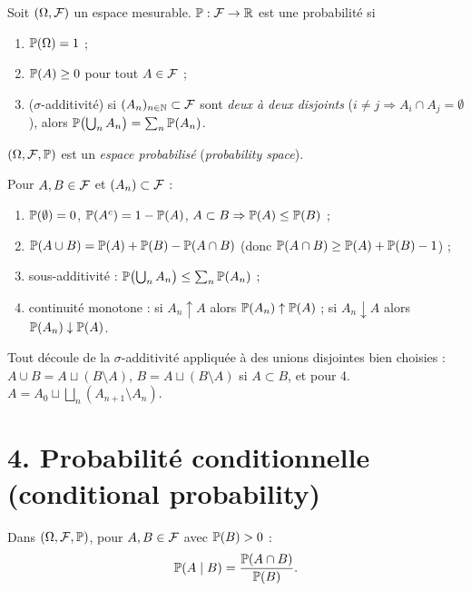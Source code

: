 \documentclass[11pt,a4paper]{article}
\begin{document}
\begin{definition}\label{C1:proba}
Soit $(\Omega,\mathcal{F})$ un espace mesurable. $\mathbb{P}:\mathcal{F}\to\mathbb{R}$ est une probabilité si
\begin{enumerate}[label=(\roman*)]
  \item $\mathbb{P}(\Omega)=1$ ;
  \item $\mathbb{P}(A)\ge 0$ pour tout $A\in\mathcal{F}$ ;
  \item ($\sigma$-additivité) si $(A_n)_{n\in\mathbb{N}}\subset\mathcal{F}$ sont \emph{deux à deux disjoints}
  ($i\neq j\Rightarrow A_i\cap A_j=\emptyset$), alors $\mathbb{P}\bigl(\bigcup_{n}A_n\bigr)=\sum_{n}\mathbb{P}(A_n)$.
\end{enumerate}
$(\Omega,\mathcal{F},\mathbb{P})$ est un \emph{espace probabilisé} (\emph{probability space}).
\end{definition}

\begin{proposition}\label{C1:prop-elem}
Pour $A,B\in\mathcal{F}$ et $(A_n)\subset\mathcal{F}$ :
\begin{enumerate}
  \item $\mathbb{P}(\emptyset)=0$, \quad $\mathbb{P}(A^c)=1-\mathbb{P}(A)$, \quad $A\subset B\Rightarrow \mathbb{P}(A)\le\mathbb{P}(B)$ ;
  \item $\mathbb{P}(A\cup B)=\mathbb{P}(A)+\mathbb{P}(B)-\mathbb{P}(A\cap B)$ (donc $\mathbb{P}(A\cap B)\ge\mathbb{P}(A)+\mathbb{P}(B)-1$) ;
  \item sous-additivité : $\mathbb{P}\bigl(\bigcup_n A_n\bigr)\le\sum_n\mathbb{P}(A_n)$ ;
  \item continuité monotone : si $A_n\uparrow A$ alors $\mathbb{P}(A_n)\uparrow\mathbb{P}(A)$ ; si $A_n\downarrow A$ alors $\mathbb{P}(A_n)\downarrow\mathbb{P}(A)$.
\end{enumerate}
\end{proposition}
\begin{idee}
Tout découle de la $\sigma$-additivité appliquée à des unions disjointes bien choisies :
$A\cup B=A\sqcup(B\setminus A)$, $B=A\sqcup(B\setminus A)$ si $A\subset B$, et pour 4.\ $A=A_0\sqcup\bigsqcup_n(A_{n+1}\setminus A_n)$.
\end{idee}

\section*{4. Probabilité conditionnelle (conditional probability)}

\begin{definition}\label{C1:condproba}
Dans $(\Omega,\mathcal{F},\mathbb{P})$, pour $A,B\in\mathcal{F}$ avec $\mathbb{P}(B)>0$ :
\[\mathbb{P}(A\mid B)=\frac{\mathbb{P}(A\cap B)}{\mathbb{P}(B)}.\]
\end{definition}
\end{document}
